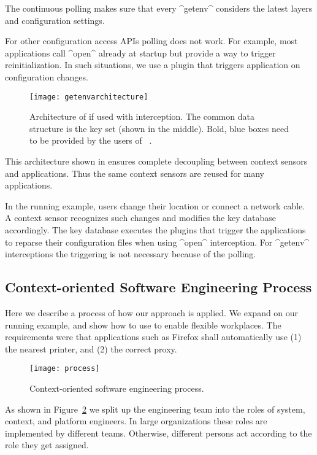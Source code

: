 The continuous polling makes sure that every ^getenv^ considers the latest layers and configuration settings.

For other configuration access APIs polling does not work.
For example, most applications call ^open^ already at startup but provide a way to trigger reinitialization.
In such situations, we use a plugin that triggers application on configuration changes.


\begin{figure}[htp]
\centering
\texttt{[image: getenvarchitecture]}
\caption[Architecture of \elektra{} with interception.]{Architecture of \elektra{} if used with interception.
The common data structure is the key set (shown in the middle).
Bold, blue boxes need to be provided by the users of \elektra{}~\cite{raab2016unanticipated}.}
\label{fig:getenvarchitecture}
\end{figure}

This architecture shown in  ensures complete decoupling between context sensors and applications.
Thus the same context sensors are reused for many applications.

In the running example, users change their location or connect a network cable.
A context sensor recognizes such changes and modifies the key database accordingly.
The key database executes the plugins that trigger the applications to reparse their configuration files when using ^open^ interception.
For ^getenv^ interceptions the triggering is not necessary because of the polling.



\subsection{Context-oriented Software Engineering Process}
\label{sec:cose-process}

Here we describe a process of how our approach is applied.
We expand on our running example, and show how to use \elektra{} to enable flexible workplaces.
The requirements were that applications such as Firefox shall automatically use (1) the nearest printer, and (2) the correct proxy.

\begin{figure}[htp]
\centering
\texttt{[image: process]}
\caption{Context-oriented software engineering process.}
\label{fig:process}
\end{figure}

As shown in Figure~\ref{fig:process} we split up the engineering team into the roles of system, context, and platform engineers.
In large organizations these roles are implemented by different teams.
Otherwise, different persons act according to the role they get assigned.

